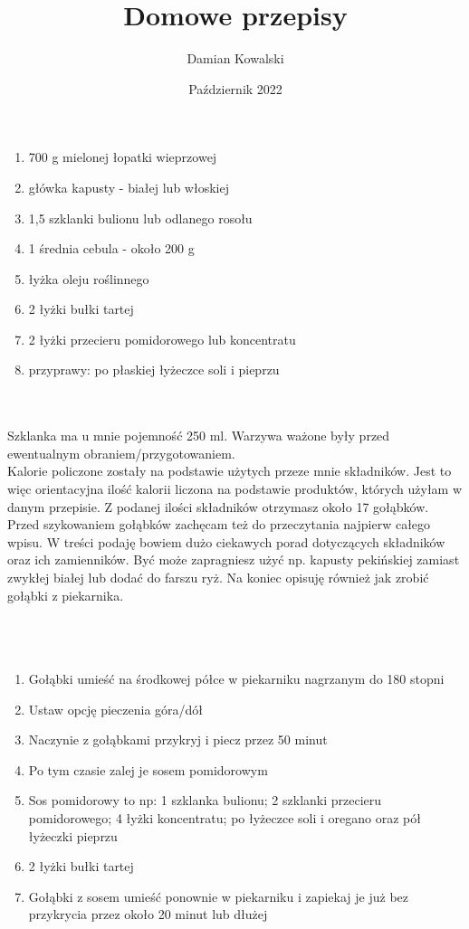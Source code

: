 \documentclass[12pt, letterpaper, titlepage]{article}
\title{Domowe przepisy}
\author{Damian Kowalski}
\date{Październik 2022}
\begin{document}
\maketitle

\newpage
{}
\par
\begin{enumerate}
\item 700 g mielonej łopatki wieprzowej
\item główka kapusty - białej lub włoskiej
\item 1,5 szklanki bulionu lub odlanego rosołu
\item 1 średnia cebula - około 200 g
\item łyżka oleju roślinnego
\item 2 łyżki bułki tartej
\item 2 łyżki przecieru pomidorowego lub koncentratu
\item przyprawy: po płaskiej łyżeczce soli i pieprzu
\end{enumerate}

\newpage
{}
\\ \\ Szklanka ma u mnie pojemność 250 ml. 
Warzywa ważone były przed ewentualnym obraniem/przygotowaniem.
\\
Kalorie policzone zostały na podstawie użytych przeze mnie składników. Jest to więc orientacyjna ilość kalorii liczona na podstawie produktów, których użyłam w danym przepisie. Z podanej ilości składników otrzymasz około 17 gołąbków. 
\\
Przed szykowaniem gołąbków zachęcam też do przeczytania najpierw całego wpisu. W treści podaję bowiem dużo ciekawych porad dotyczących składników oraz ich zamienników. Być może zapragniesz użyć np. kapusty pekińskiej zamiast zwykłej białej lub dodać do farszu ryż. Na koniec opisuję również jak zrobić gołąbki z piekarnika.
\\
\\
\\
{}
\\
\begin{enumerate}
\item Gołąbki umieść na środkowej półce w piekarniku nagrzanym do 180 stopni
\item Ustaw opcję pieczenia góra/dół
\item Naczynie z gołąbkami przykryj i piecz przez 50 minut
\item Po tym czasie zalej je sosem pomidorowym
\item Sos pomidorowy to np: 1 szklanka bulionu; 2 szklanki przecieru pomidorowego; 4 łyżki koncentratu; po łyżeczce soli i oregano oraz pół łyżeczki pieprzu
\item 2 łyżki bułki tartej
\item Gołąbki z sosem umieść ponownie w piekarniku i zapiekaj je już bez przykrycia przez około 20 minut lub dłużej
\end{enumerate}
\end{document}

